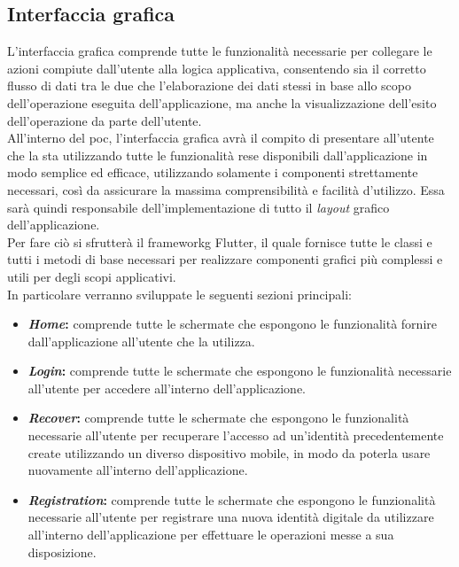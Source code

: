\subsection{Interfaccia grafica}

L'interfaccia grafica comprende tutte le funzionalità necessarie per collegare le azioni compiute dall'utente alla logica applicativa, consentendo sia il corretto flusso di dati tra le due che l'elaborazione dei dati stessi in base allo scopo dell'operazione eseguita dell'applicazione, ma anche la visualizzazione dell'esito dell'operazione da parte dell'utente.\\
All'interno del \gls{poc}, l'interfaccia grafica avrà il compito di presentare all'utente che la sta utilizzando tutte le funzionalità rese disponibili dall'applicazione in modo semplice ed efficace, utilizzando solamente i componenti strettamente necessari, così da assicurare la massima comprensibilità e facilità d'utilizzo. Essa sarà quindi responsabile dell'implementazione di tutto il \textit{layout} grafico dell'applicazione.\\
Per fare ciò si sfrutterà il \gls{frameworkg} Flutter, il quale fornisce tutte le classi e tutti i metodi di base necessari per realizzare componenti grafici più complessi e utili per degli scopi applicativi.\\
 In particolare verranno sviluppate le seguenti sezioni principali:

\begin{itemize}
	\item \textbf{\textit{Home}:} comprende tutte le schermate che espongono le funzionalità fornire dall'applicazione all'utente che la utilizza.
	\item \textbf{\textit{Login}:} comprende tutte le schermate che espongono le funzionalità necessarie all'utente per accedere all'interno dell'applicazione.
	\item \textbf{\textit{Recover}:} comprende tutte le schermate che espongono le funzionalità necessarie all'utente per recuperare l'accesso ad un'identità precedentemente create utilizzando un diverso dispositivo mobile, in modo da poterla usare nuovamente all'interno dell'applicazione.
	\item \textbf{\textit{Registration}:} comprende tutte le schermate che espongono le funzionalità necessarie all'utente per registrare una nuova identità digitale da utilizzare all'interno dell'applicazione per effettuare le operazioni messe a sua disposizione.
\end{itemize}

